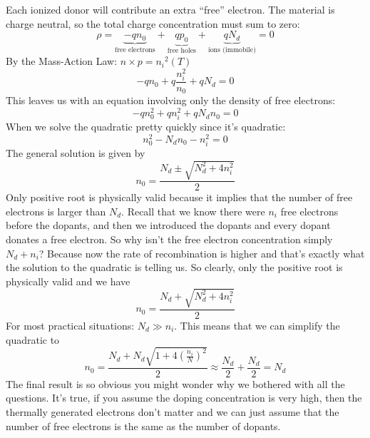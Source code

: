 Each ionized donor will contribute an extra “free” electron.  The material is charge neutral, so the total charge concentration must sum to zero:
%
\begin{equation}
        \rho  =  \underbrace{- q{n_0}}_{\text{free electrons}}
        + \underbrace{q{p_0}}_{\text{free holes}} +
        \underbrace{q{N_d}}_{\text{ions (immobile)}}  = 0
\end{equation}
%
By the Mass-Action Law:  $n \times p = {n_i}^2(T)$
\begin{equation}
         - q{n_0} + q\frac{{n_i^2}}{{{n_0}}} + q{N_d} = 0
\end{equation}
This leaves us with an equation involving only the density of free electrons:
%
\begin{equation}
- qn_0^2 + qn_i^2 + q{N_d}{n_0} = 0
\end{equation}
%
When we solve the quadratic pretty quickly since it’s quadratic:
%
\begin{equation}
n_0^2 - {N_d}{n_0} - n_i^2 = 0
\end{equation}
The general solution is given by
\begin{equation}
        {n_0} = \frac{{{N_d} \pm \sqrt {N_d^2 + 4n_i^2} }}{2}
\end{equation}
Only positive root is physically valid because it implies that the number of free electrons is larger than $N_d$.  Recall that we know there were $n_i$ free electrons before the dopants, and then we introduced the dopants and every dopant donates a free electron.  So why isn’t the free electron concentration simply $N_d + n_i$?  Because now the rate of recombination is higher and that’s exactly what the solution to the quadratic is telling us.  So clearly, only the positive root is physically valid and we have
%
\begin{equation}
        {n_0} = \frac{{{N_d} + \sqrt {N_d^2 + 4n_i^2} }}{2}
\end{equation}
%
For most practical situations:  ${N_d} \gg {n_i}$.  This means that we can simplify the quadratic to 
\begin{equation}
{n_0} = \frac{{{N_d} + {N_d}\sqrt {1 + 4{{\left( {\frac{{{n_i}}}{N}} \right)}^2}} }}{2} \approx \frac{{{N_d}}}{2} + \frac{{{N_d}}}{2} = {N_d}
\end{equation}
%
The final result is so obvious you might wonder why we bothered with all the questions.  It’s true, if you assume the doping concentration is very high, then the thermally generated electrons don’t matter and we can just assume that the number of free electrons is the same as the number of dopants.




